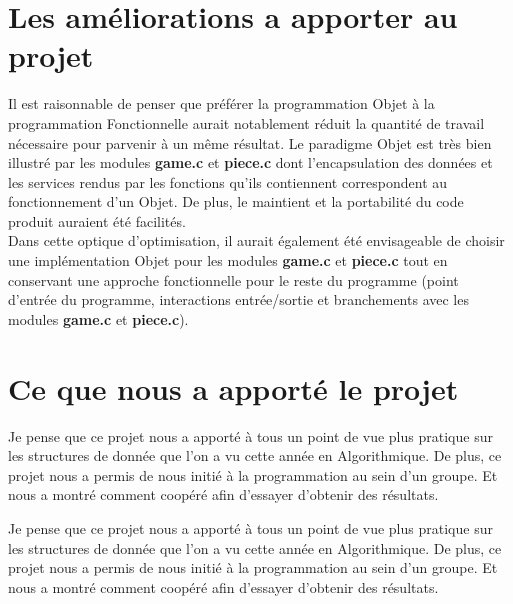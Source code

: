\documentclass{report}
\begin{document}
\section{Les améliorations a apporter au projet}
Il est raisonnable de penser que préférer la programmation Objet à la programmation Fonctionnelle aurait notablement réduit la quantité de travail nécessaire pour parvenir à un même résultat. Le paradigme Objet est très bien illustré par les modules \textbf{game.c} et \textbf{piece.c} dont l'encapsulation des données et les services rendus par les fonctions qu'ils contiennent correspondent au fonctionnement d'un Objet. De plus, le maintient et la portabilité du code produit auraient été facilités.\\
Dans cette optique d'optimisation, il aurait également été envisageable de choisir une implémentation Objet pour les modules \textbf{game.c} et \textbf{piece.c} tout en conservant une approche fonctionnelle pour le reste du programme (point d'entrée du programme, interactions entrée/sortie et branchements avec les modules \textbf{game.c} et \textbf{piece.c}).

\section{Ce que nous a apporté le projet}
Je pense que ce projet nous a apporté à tous un point de vue plus pratique sur les structures de donnée que l'on a vu cette année en Algorithmique. De plus, ce projet nous a permis de nous initié à la programmation au sein d'un groupe. Et nous a montré comment coopéré afin d'essayer d'obtenir des résultats.

Je pense que ce projet nous a apporté à tous un point de vue plus pratique sur les structures de donnée que l'on a vu cette année en Algorithmique. De plus, ce projet nous a permis de nous initié à la programmation au sein d'un groupe. Et nous a montré comment coopéré afin d'essayer d'obtenir des résultats.
\end{document}
